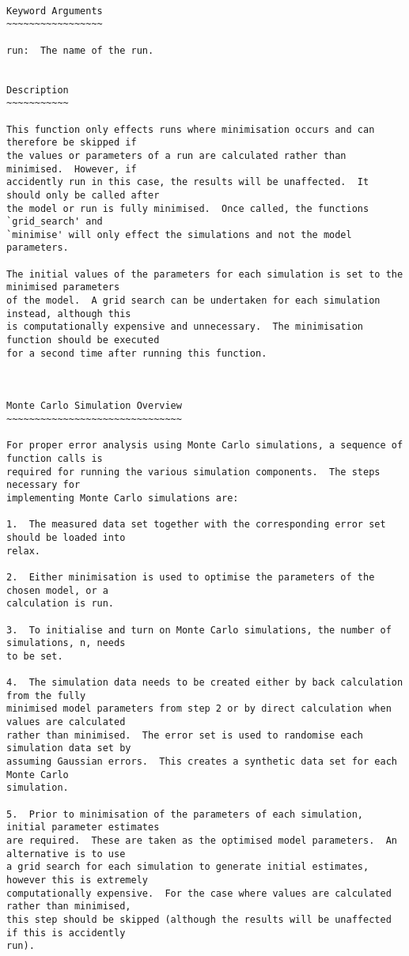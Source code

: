 {\scriptsize
\begin{verbatim}

Keyword Arguments
~~~~~~~~~~~~~~~~~

run:  The name of the run.


Description
~~~~~~~~~~~

This function only effects runs where minimisation occurs and can therefore be skipped if
the values or parameters of a run are calculated rather than minimised.  However, if
accidently run in this case, the results will be unaffected.  It should only be called after
the model or run is fully minimised.  Once called, the functions `grid_search' and
`minimise' will only effect the simulations and not the model parameters.

The initial values of the parameters for each simulation is set to the minimised parameters
of the model.  A grid search can be undertaken for each simulation instead, although this
is computationally expensive and unnecessary.  The minimisation function should be executed
for a second time after running this function.



Monte Carlo Simulation Overview
~~~~~~~~~~~~~~~~~~~~~~~~~~~~~~~

For proper error analysis using Monte Carlo simulations, a sequence of function calls is
required for running the various simulation components.  The steps necessary for
implementing Monte Carlo simulations are:

1.  The measured data set together with the corresponding error set should be loaded into
relax.

2.  Either minimisation is used to optimise the parameters of the chosen model, or a
calculation is run.

3.  To initialise and turn on Monte Carlo simulations, the number of simulations, n, needs
to be set.

4.  The simulation data needs to be created either by back calculation from the fully
minimised model parameters from step 2 or by direct calculation when values are calculated
rather than minimised.  The error set is used to randomise each simulation data set by
assuming Gaussian errors.  This creates a synthetic data set for each Monte Carlo
simulation.

5.  Prior to minimisation of the parameters of each simulation, initial parameter estimates
are required.  These are taken as the optimised model parameters.  An alternative is to use
a grid search for each simulation to generate initial estimates, however this is extremely
computationally expensive.  For the case where values are calculated rather than minimised,
this step should be skipped (although the results will be unaffected if this is accidently
run).


\end{verbatim}}
